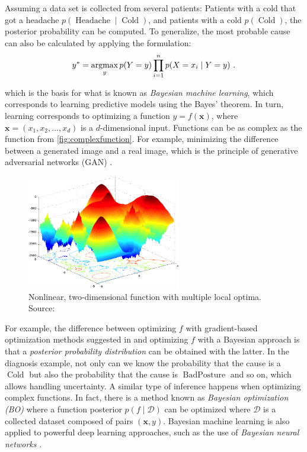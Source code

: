 Assuming a data set is collected from several patients: Patients with a cold that got a headache $p(\operatorname{Headache} \mid \operatorname{Cold})$, and patients with a cold $p(\operatorname{Cold})$, the posterior probability can be computed. To generalize, the most probable cause can also be calculated by applying the formulation:
\begin{align}
y^* = \operatorname*{argmax}_{y} p(Y=y)\prod_{i=1}^n p(X=x_i\mid Y=y)~.
\end{align}

which is the basis for what is known as \textit{Bayesian machine learning}, which corresponds to learning predictive models using the Bayes' theorem. In turn, learning corresponds to optimizing a function $y = f(\mathbf{x})$, where $\mathbf{x} = (x_1, x_2, \ldots, x_d)$ is a $d$-dimensional input. Functions can be as complex as the function from \autoref{fig:complexfunction}. For example, minimizing the difference between a generated image and a real image, which is the principle of generative adversarial networks (GAN) \parencite{gonog2019review}.

\begin{figure}[h]
    \centering
    \includegraphics[width=0.6\textwidth]{figures/complexfunction.png}
    \caption{Nonlinear, two-dimensional function with multiple local optima. Source: \parencite{li2013benchmark}}
    \label{fig:complexfunction}
\end{figure}

For example, the difference between optimizing $f$ with gradient-based optimization methods suggested in \textcite{bengio2000gradient} and optimizing $f$ with a Bayesian approach is that a \textit{posterior probability distribution} can be obtained with the latter. In the diagnosis example, not only can we know the probability that the cause is a $\operatorname{Cold}$ but also the probability that the cause is $\operatorname{BadPosture}$ and so on, which allows handling uncertainty. A similar type of inference happens when optimizing complex functions. In fact, there is a method known as \textit{Bayesian optimization (BO)} \parencite{shahriari2015taking} where a function posterior $p(f \mid \mathcal{D})$ can be optimized where $\mathcal{D}$ is a collected dataset composed of pairs $(\mathbf{x}, y)$. Bayesian machine learning is also applied to powerful deep learning approaches, such as the use of \textit{Bayesian neural networks} \parencite{jospin2022hands}. 

